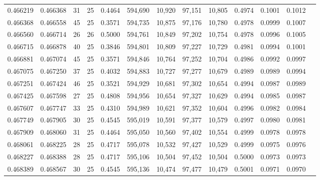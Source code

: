 \begin{tabular}{rrrrrrrrrrrrr}
0.466219 & 0.466368 &    31 &  25 &                                     0.4464 & 594,690 &  10,920 &  97,151 &  10,805 & 0.4974 & 0.1001 & 0.1012 \\
0.466368 & 0.466558 &    45 &  25 &                                     0.3571 & 594,735 &  10,875 &  97,176 &  10,780 & 0.4978 & 0.0999 & 0.1007 \\
0.466560 & 0.466714 &    26 &  26 &                                     0.5000 & 594,761 &  10,849 &  97,202 &  10,754 & 0.4978 & 0.0996 & 0.1005 \\
0.466715 & 0.466878 &    40 &  25 &                                     0.3846 & 594,801 &  10,809 &  97,227 &  10,729 & 0.4981 & 0.0994 & 0.1001 \\
0.466881 & 0.467074 &    45 &  25 &                                     0.3571 & 594,846 &  10,764 &  97,252 &  10,704 & 0.4986 & 0.0992 & 0.0997 \\
0.467075 & 0.467250 &    37 &  25 &                                     0.4032 & 594,883 &  10,727 &  97,277 &  10,679 & 0.4989 & 0.0989 & 0.0994 \\
0.467251 & 0.467424 &    46 &  25 &                                     0.3521 & 594,929 &  10,681 &  97,302 &  10,654 & 0.4994 & 0.0987 & 0.0989 \\
0.467425 & 0.467598 &    27 &  25 &                                     0.4808 & 594,956 &  10,654 &  97,327 &  10,629 & 0.4994 & 0.0985 & 0.0987 \\
0.467607 & 0.467747 &    33 &  25 &                                     0.4310 & 594,989 &  10,621 &  97,352 &  10,604 & 0.4996 & 0.0982 & 0.0984 \\
0.467749 & 0.467905 &    30 &  25 &                                     0.4545 & 595,019 &  10,591 &  97,377 &  10,579 & 0.4997 & 0.0980 & 0.0981 \\
0.467909 & 0.468060 &    31 &  25 &                                     0.4464 & 595,050 &  10,560 &  97,402 &  10,554 & 0.4999 & 0.0978 & 0.0978 \\
0.468061 & 0.468225 &    28 &  25 &                                     0.4717 & 595,078 &  10,532 &  97,427 &  10,529 & 0.4999 & 0.0975 & 0.0976 \\
0.468227 & 0.468388 &    28 &  25 &                                     0.4717 & 595,106 &  10,504 &  97,452 &  10,504 & 0.5000 & 0.0973 & 0.0973 \\
0.468389 & 0.468567 &    30 &  25 &                                     0.4545 & 595,136 &  10,474 &  97,477 &  10,479 & 0.5001 & 0.0971 & 0.0970 \\

\end{tabular}
